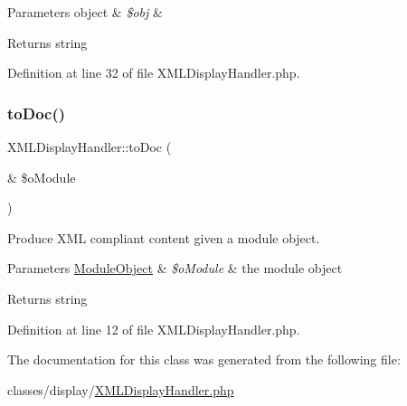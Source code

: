 \begin{DoxyParams}[1]{Parameters}
object & {\em \$obj} & \\
\hline
\end{DoxyParams}
\begin{DoxyReturn}{Returns}
string 
\end{DoxyReturn}


Definition at line 32 of file X\+M\+L\+Display\+Handler.\+php.

\mbox{\label{classXMLDisplayHandler_adebe0869fea845f4007acc2b84e2d24c}} 
\subsubsection{\texorpdfstring{to\+Doc()}{toDoc()}}
{\footnotesize\ttfamily X\+M\+L\+Display\+Handler\+::to\+Doc (\begin{DoxyParamCaption}\item[{\&}]{\$o\+Module }\end{DoxyParamCaption})}

Produce X\+ML compliant content given a module object.~\newline

\begin{DoxyParams}[1]{Parameters}
\hyperlink{classModuleObject}{Module\+Object} & {\em \$o\+Module} & the module object \\
\hline
\end{DoxyParams}
\begin{DoxyReturn}{Returns}
string 
\end{DoxyReturn}


Definition at line 12 of file X\+M\+L\+Display\+Handler.\+php.



The documentation for this class was generated from the following file\+:\begin{DoxyCompactItemize}
\item 
classes/display/\hyperlink{XMLDisplayHandler_8php}{X\+M\+L\+Display\+Handler.\+php}\end{DoxyCompactItemize}
